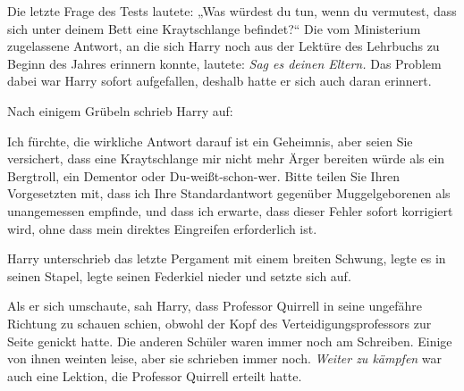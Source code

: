 Die letzte Frage des Tests lautete:
„Was würdest du tun, wenn du vermutest, dass sich unter deinem Bett eine Kraytschlange befindet?“ Die vom Ministerium zugelassene Antwort, an die sich Harry noch aus der Lektüre des Lehrbuchs zu Beginn des Jahres erinnern konnte, lautete: \emph{Sag es deinen Eltern.}
Das Problem dabei war Harry sofort aufgefallen, deshalb hatte er sich auch daran erinnert.

Nach einigem Grübeln schrieb Harry auf:

\begin{writtenNote}
Ich fürchte, die wirkliche Antwort darauf ist ein Geheimnis, aber seien Sie versichert, dass eine Kraytschlange mir nicht mehr Ärger bereiten würde als ein Bergtroll, ein Dementor oder Du-weißt-schon-wer. Bitte teilen Sie Ihren Vorgesetzten mit, dass ich Ihre Standardantwort gegenüber Muggelgeborenen als unangemessen empfinde, und dass ich erwarte, dass dieser Fehler sofort korrigiert wird, ohne dass mein direktes Eingreifen erforderlich ist.
\end{writtenNote}

Harry unterschrieb das letzte Pergament mit einem breiten Schwung, legte es in seinen Stapel, legte seinen Federkiel nieder und setzte sich auf.

Als er sich umschaute, sah Harry, dass Professor Quirrell in seine ungefähre Richtung zu schauen schien, obwohl der Kopf des Verteidigungsprofessors zur Seite genickt hatte.
Die anderen Schüler waren immer noch am Schreiben. Einige von ihnen weinten leise, aber sie schrieben immer noch. \emph{Weiter zu kämpfen} war auch eine Lektion, die Professor Quirrell erteilt hatte.

